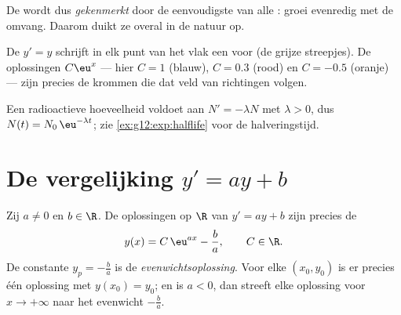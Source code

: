 \begin{remark}
De  wordt dus \emph{gekenmerkt} door de eenvoudigste van
alle : groei evenredig met de omvang. Daarom duikt
ze overal in de natuur op.
\end{remark}

\begin{omfigure}

{\small De  $y' = y$ schrijft in elk punt van het vlak een
 voor (de grijze streepjes). De oplossingen $C\eu^{x}$
--- hier $C = 1$ (blauw), $C = 0.3$ (rood) en $C = -0.5$ (oranje) --- zijn
precies de krommen die dat veld van richtingen volgen.}
\end{omfigure}

\begin{example}\label{ex:g12:diffeq:decay}
Een radioactieve hoeveelheid voldoet aan $N' = -\lambda N$ met
$\lambda > 0$, dus $N(t) = N_0\,\eu^{-\lambda t}$; zie
\cref{ex:g12:exp:halflife} voor de halveringstijd.
\end{example}

\section{De vergelijking \texorpdfstring{$y' = ay + b$}{y' = ay + b}}

\begin{theorem}[Oplossingen van $y' = ay + b$]\label{thm:g12:diffeq:affine}
Zij $a \neq 0$ en $b \in \R$. De oplossingen op $\R$ van $y' = ay + b$ zijn
precies de 
\[
y(x) = C\,\eu^{ax} - \frac{b}{a}, \qquad C \in \R .
\]
De constante  $y_p = -\frac ba$ is de \emph{evenwichtsoplossing}. Voor
elke $(x_0, y_0)$ is er precies één oplossing met $y(x_0) = y_0$; en is
$a < 0$, dan streeft elke oplossing voor $x \to +\infty$ naar het evenwicht
$-\frac ba$.
\end{theorem}


